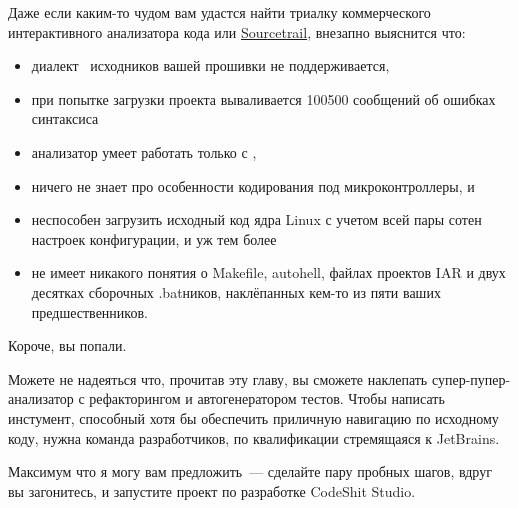 \label{codein}

Даже если каким-то чудом вам удастся найти триалку коммерческого интерактивного
анализатора кода или \href{https://www.sourcetrail.com/}{Sourcetrail}, внезапно
выяснится что:
\begin{itemize}[nosep]
  \item диалект \emc\ исходников вашей прошивки не поддерживается,
  \item при попытке загрузки проекта вываливается 100500 сообщений об ошибках
  синтаксиса
  \item анализатор умеет работать только с \cpp,
  \item ничего не знает про особенности кодирования под микроконтроллеры, и
  \item неспособен загрузить исходный код ядра Linux с учетом всей пары сотен
  настроек конфигурации, и уж тем более
  \item не имеет никакого понятия о Makefile, autohell, файлах проектов IAR и
  двух десятках сборочных .batников, наклёпанных кем-то из пяти ваших
  предшественников.
\end{itemize}

\clearpage
Короче, вы попали.
\bigskip

Можете не надеяться что, прочитав эту главу, вы сможете наклепать
супер-пупер-анализатор с рефакторингом и автогенератором тестов. Чтобы написать
инстумент, способный хотя бы обеспечить приличную навигацию по исходному коду,
нужна команда разработчиков, по квалификации стремящаяся к JetBrains.

Максимум что я могу вам предложить\ --- сделайте пару пробных шагов, вдруг вы
загонитесь, и запустите проект по разработке CodeShit Studio.
